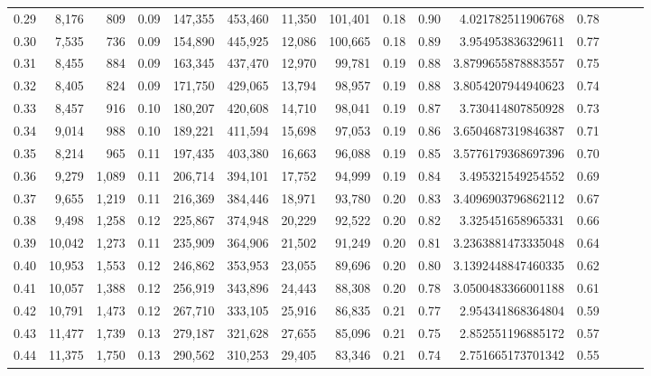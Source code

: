 \begin{tabular}{rrrrrrrrrrrrrrr}
0.29 &   8,176 &    809 &  0.09 &  147,355 &  453,460 &   11,350 &  101,401 &  0.18 &  0.90 &     4.021782511906768 &      0.78 \\
0.30 &   7,535 &    736 &  0.09 &  154,890 &  445,925 &   12,086 &  100,665 &  0.18 &  0.89 &     3.954953836329611 &      0.77 \\
0.31 &   8,455 &    884 &  0.09 &  163,345 &  437,470 &   12,970 &   99,781 &  0.19 &  0.88 &    3.8799655878883557 &      0.75 \\
0.32 &   8,405 &    824 &  0.09 &  171,750 &  429,065 &   13,794 &   98,957 &  0.19 &  0.88 &    3.8054207944940623 &      0.74 \\
0.33 &   8,457 &    916 &  0.10 &  180,207 &  420,608 &   14,710 &   98,041 &  0.19 &  0.87 &     3.730414807850928 &      0.73 \\
0.34 &   9,014 &    988 &  0.10 &  189,221 &  411,594 &   15,698 &   97,053 &  0.19 &  0.86 &    3.6504687319846387 &      0.71 \\
0.35 &   8,214 &    965 &  0.11 &  197,435 &  403,380 &   16,663 &   96,088 &  0.19 &  0.85 &    3.5776179368697396 &      0.70 \\
0.36 &   9,279 &  1,089 &  0.11 &  206,714 &  394,101 &   17,752 &   94,999 &  0.19 &  0.84 &     3.495321549254552 &      0.69 \\
0.37 &   9,655 &  1,219 &  0.11 &  216,369 &  384,446 &   18,971 &   93,780 &  0.20 &  0.83 &    3.4096903796862112 &      0.67 \\
0.38 &   9,498 &  1,258 &  0.12 &  225,867 &  374,948 &   20,229 &   92,522 &  0.20 &  0.82 &     3.325451658965331 &      0.66 \\
0.39 &  10,042 &  1,273 &  0.11 &  235,909 &  364,906 &   21,502 &   91,249 &  0.20 &  0.81 &    3.2363881473335048 &      0.64 \\
0.40 &  10,953 &  1,553 &  0.12 &  246,862 &  353,953 &   23,055 &   89,696 &  0.20 &  0.80 &    3.1392448847460335 &      0.62 \\
0.41 &  10,057 &  1,388 &  0.12 &  256,919 &  343,896 &   24,443 &   88,308 &  0.20 &  0.78 &    3.0500483366001188 &      0.61 \\
0.42 &  10,791 &  1,473 &  0.12 &  267,710 &  333,105 &   25,916 &   86,835 &  0.21 &  0.77 &     2.954341868364804 &      0.59 \\
0.43 &  11,477 &  1,739 &  0.13 &  279,187 &  321,628 &   27,655 &   85,096 &  0.21 &  0.75 &     2.852551196885172 &      0.57 \\
0.44 &  11,375 &  1,750 &  0.13 &  290,562 &  310,253 &   29,405 &   83,346 &  0.21 &  0.74 &     2.751665173701342 &      0.55 \\

\end{tabular}
